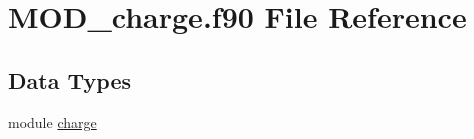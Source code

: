 \hypertarget{MOD__charge_8f90}{\section{M\-O\-D\-\_\-charge.\-f90 File Reference}
\label{MOD__charge_8f90}
}
\subsection*{Data Types}
\begin{DoxyCompactItemize}
\item 
module \hyperlink{classcharge}{charge}
\end{DoxyCompactItemize}
